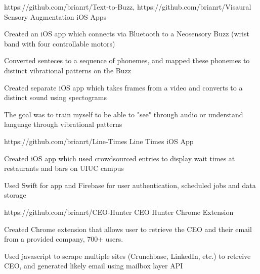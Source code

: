 

\begin{cventries}


  \cventry
    {https://github.com/brianrt/Text-to-Buzz, https://github.com/brianrt/Visaural} %
    {Sensory Augmentation iOS Apps} %
    {} %
    {} %
    {
      \begin{cvitems} %
        \item {Created an iOS app which connects via Bluetooth to a Neosensory Buzz (wrist band with four controllable motors)}
        \item {Converted senteces to a sequence of phonemes, and mapped these phonemes to distinct vibrational patterns on the Buzz}
        \item {Created separate iOS app which takes frames from a video and converts to a distinct sound using spectograms}
        \item {The goal was to train myself to be able to "see" through audio or understand language through vibrational patterns}
      \end{cvitems}
    }

  \cventry
    {https://github.com/brianrt/Line-Times} %
    {Line Times iOS App} %
    {} %
    {} %
    {
      \begin{cvitems} %
        \item {Created iOS app which used crowdsourced entries to display wait times at restaurants and bars on UIUC campus}
        \item {Used Swift for app and Firebase for user authentication, scheduled jobs and data storage}
      \end{cvitems}
    }

  \cventry
    {https://github.com/brianrt/CEO-Hunter} %
    {CEO Hunter Chrome Extension} %
    {} %
    {} %
    {
      \begin{cvitems} %
        \item {Created Chrome extension that allows user to retrieve the CEO and their email from a provided company, 700+ users.}
        \item {Used javascript to scrape multiple sites (Crunchbase, LinkedIn, etc.) to retreive CEO, and generated likely email using mailbox layer API}
      \end{cvitems}
    }

\end{cventries}
